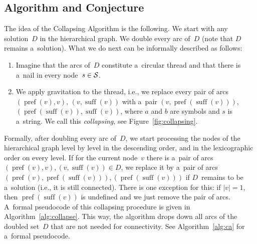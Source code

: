 \documentclass[11pt]{article}
\DeclareMathOperator{\pref}{pref}
\DeclareMathOperator{\suff}{suff}
\begin{document}
\subsection{Algorithm and Conjecture}
\label{sec:alg_conj}
The idea of the Collapsing Algorithm is the following. 
We start with any solution~$D$ in the hierarchical graph. 
We double every arc of~$D$ (note that $D$ remains a~solution). What we do next can be informally described as follows:
\begin{enumerate}
\item Imagine that the arcs of~$D$ constitute a~circular thread and that there is a~nail in every node~$s \in {\cal S}$.
\item We apply gravitation to the thread, i.e., we replace every pair of arcs $(\pref(v), v)$, $(v, \suff(v))$ 
with a~pair $(v, \pref(\suff(v)))$, $(\pref(\suff(v)), \suff(v))$, where $a$ and $b$ are symbols and $s$ is a~string. We call this {\em collapsing}, see Figure~\ref{fig:collapsing}.
\end{enumerate}
Formally, after doubling every arc of~$D$, we start processing the nodes of the hierarchical graph level by level in the descending order, and in the lexicographic order on every level. If for the current node~$v$ there is a~pair of arcs $(\pref(v), v), (v, \suff(v)) \in D$, we replace it by a~pair of arcs $(\pref(v), \pref(\suff(v))), (\pref(\suff(v)))$ if $D$~remains to be a~solution (i.e., it is still connected). There is one exception for this: if $|v|=1$, then $\pref(\suff(v))$ is undefined and we just remove the pair of arcs. 
A~formal pseudocode of this collapsing procedure is given in Algorithm~\ref{alg:collapse}. This way, the algorithm drops down all arcs of the doubled set~$D$ that are not needed for connectivity. See Algorithm~\ref{alg:ca} for a~formal pseudocode.
\end{document}
